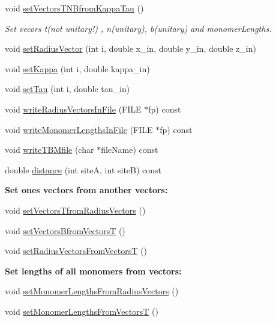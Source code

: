 \begin{DoxyCompactItemize}
void \hyperlink{class_p_c_a_1_1_polymer_a55787461ed50776c48819a5cc3911c38}{set\+Vectors\+T\+N\+Bfrom\+Kappa\+Tau} ()
\begin{DoxyCompactList}\small\item\em Set vecors t(not unitary!) , n(unitary), b(unitary) and monomer\+Lengths. \end{DoxyCompactList}\item 
void \hyperlink{class_p_c_a_1_1_polymer_a0c6e93aa35271b98d92a38afd2b0913d}{set\+Radius\+Vector} (int i, double x\+\_\+in, double y\+\_\+in, double z\+\_\+in)
\item 
void \hyperlink{class_p_c_a_1_1_polymer_ac8631ac2842b00802f24478b525c05db}{set\+Kappa} (int i, double kappa\+\_\+in)
\item 
void \hyperlink{class_p_c_a_1_1_polymer_a4ac116507767651444c852a75ab79c2d}{set\+Tau} (int i, double tau\+\_\+in)
\item 
void \hyperlink{class_p_c_a_1_1_polymer_a9859e587476da47e49cfee1152e93fa0}{write\+Radius\+Vectors\+In\+File} (F\+I\+LE $\ast$fp) const
\item 
void \hyperlink{class_p_c_a_1_1_polymer_a081b8e4d7cac0da6cc411c7b56ff7362}{write\+Monomer\+Lengths\+In\+File} (F\+I\+LE $\ast$fp) const
\item 
void \hyperlink{class_p_c_a_1_1_polymer_ac89188a3e56684ff3313a43ff83abea0}{write\+T\+B\+Mfile} (char $\ast$file\+Name) const
\item 
double \hyperlink{class_p_c_a_1_1_polymer_a901d8c030d3edb333498edcc4502b27a}{distance} (int siteA, int siteB) const
\end{DoxyCompactItemize}
\begin{Indent}{\bf Set ones vectors from another vectors\+:}\par
\begin{DoxyCompactItemize}
\item 
void \hyperlink{class_p_c_a_1_1_polymer_aa655eb1299b272fef8c91f003abbf50d}{set\+Vectors\+Tfrom\+Radius\+Vectors} ()
\item 
void \hyperlink{class_p_c_a_1_1_polymer_a8dad939cbc8d8df73784526ad4a07aef}{set\+Vectors\+Bfrom\+VectorsT} ()
\item 
void \hyperlink{class_p_c_a_1_1_polymer_a258f607c38c1a247dd37659b236aa3fa}{set\+Radius\+Vectors\+From\+VectorsT} ()
\end{DoxyCompactItemize}
\end{Indent}
\begin{Indent}{\bf Set lengths of all monomers from vectors\+:}\par
\begin{DoxyCompactItemize}
\item 
void \hyperlink{class_p_c_a_1_1_polymer_a2dae638afa952c286c16122c7ab52b6e}{set\+Monomer\+Lengths\+From\+Radius\+Vectors} ()
\item 
void \hyperlink{class_p_c_a_1_1_polymer_a217cddfa5b9e5bfe68f8e5d0802e2f31}{set\+Monomer\+Lengths\+From\+VectorsT} ()
\end{DoxyCompactItemize}
\end{Indent}
